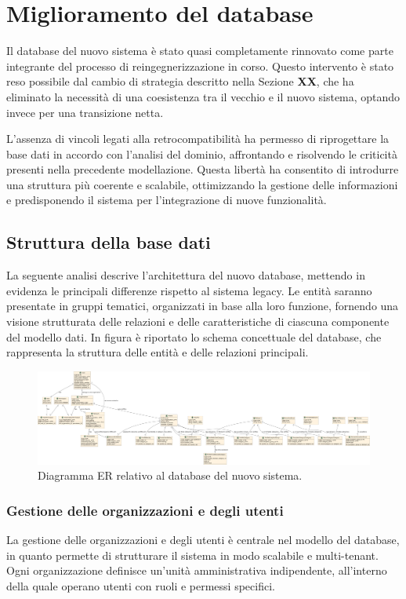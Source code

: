 \section{Miglioramento del database}
Il database del nuovo sistema è stato quasi completamente rinnovato come parte integrante del processo di reingegnerizzazione in corso. Questo intervento è stato reso possibile dal cambio di strategia descritto nella Sezione \textbf{XX}, che ha eliminato la necessità di una coesistenza tra il vecchio e il nuovo sistema, optando invece per una transizione netta.

L’assenza di vincoli legati alla retrocompatibilità ha permesso di riprogettare la base dati in accordo con l’analisi del dominio, affrontando e risolvendo le criticità presenti nella precedente modellazione. Questa libertà ha consentito di introdurre una struttura più coerente e scalabile, ottimizzando la gestione delle informazioni e predisponendo il sistema per l’integrazione di nuove funzionalità.

\subsection{Struttura della base dati}
La seguente analisi descrive l'architettura del nuovo database, mettendo in evidenza le principali differenze rispetto al sistema legacy. Le entità saranno presentate in gruppi tematici, organizzati in base alla loro funzione, fornendo una visione strutturata delle relazioni e delle caratteristiche di ciascuna componente del modello dati. In figura  è riportato lo schema concettuale del database, che rappresenta la struttura delle entità e delle relazioni principali.

\begin{figure}
  \centering
  \includegraphics[width=1\textwidth]{figures/new_database_schema.pdf}
  \caption{Diagramma ER relativo al database del nuovo sistema.}
  \label{fig:database-schema}
\end{figure}

\subsubsection{Gestione delle organizzazioni e degli utenti}
La gestione delle organizzazioni e degli utenti è centrale nel modello del database, in quanto permette di strutturare il sistema in modo scalabile e multi-tenant. Ogni organizzazione definisce un'unità amministrativa indipendente, all'interno della quale operano utenti con ruoli e permessi specifici.

